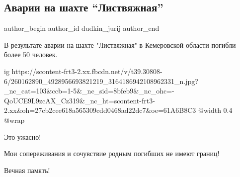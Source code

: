  
 
 
 
 
 
\subsection{Аварии на шахте \enquote{Листвяжная}}
\label{sec:26_11_2021.fb.dudkin_jurij.1.avaria_na_shahte}
 
\ifcmt
 author_begin
   author_id dudkin_jurij
 author_end
\fi


В результате аварии на шахте "Листвяжная" в Кемеровской области погибли более
50 человек.

\ifcmt
  ig https://scontent-frt3-2.xx.fbcdn.net/v/t39.30808-6/260162890_4928956693821219_3164186942108962331_n.jpg?_nc_cat=103&ccb=1-5&_nc_sid=8bfeb9&_nc_ohc=-QoUCE9L9zcAX_Cz319&_nc_ht=scontent-frt3-2.xx&oh=27cb2cee618a565309cdd0468ad22dc7&oe=61A6B8C3
  @width 0.4
  @wrap 
\fi

Это ужасно!

Мои сопереживания и сочувствие родным погибших не имеют границ!

Вечная память!

